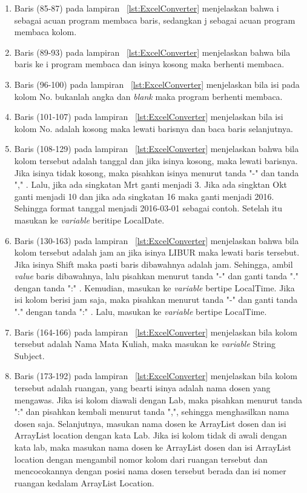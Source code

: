 \begin{enumerate}
\begin{enumerate}
		\item Baris (85-87) pada lampiran ~\ref{lst:ExcelConverter} menjelaskan bahwa i sebagai acuan program membaca baris, sedangkan j sebagai acuan program membaca kolom.
		\item Baris (89-93) pada lampiran ~\ref{lst:ExcelConverter} menjelaskan bahwa bila baris ke i program membaca dan isinya kosong maka berhenti membaca.
		\item Baris (96-100) pada lampiran ~\ref{lst:ExcelConverter} menjelaskan bila isi pada kolom No. bukanlah angka dan \textit{blank} maka program berhenti membaca.
		\item Baris (101-107) pada lampiran ~\ref{lst:ExcelConverter} menjelaskan	bila isi kolom No. adalah kosong maka lewati barisnya dan baca baris selanjutnya.
		\item Baris (108-129) pada lampiran ~\ref{lst:ExcelConverter} menjelaskan bahwa bila kolom tersebut adalah tanggal dan jika isinya kosong, maka lewati barisnya. Jika isinya tidak kosong, maka pisahkan isinya menurut tanda "-" dan tanda "," . Lalu, jika ada singkatan Mrt ganti menjadi 3. Jika ada singktan Okt ganti menjadi 10 dan jika ada singkatan 16 maka ganti menjadi 2016. Sehingga format tanggal menjadi 2016-03-01 sebagai contoh. Setelah itu masukan ke \textit{variable} beritipe LocalDate.
		\item Baris (130-163) pada lampiran ~\ref{lst:ExcelConverter} menjelaskan bahwa bila kolom tersebut adalah jam an jika isinya LIBUR maka lewati baris tersebut. Jika isinya Shift maka pasti baris dibawahnya adalah jam. Sehingga, ambil \textit{value} baris dibawahnya, lalu pisahkan menurut tanda "-" dan ganti tanda "." dengan tanda ":" . Kemudian, masukan ke \textit{variable} bertipe LocalTime. Jika isi kolom berisi jam saja, maka pisahkan menurut tanda "-" dan ganti tanda "." dengan tanda ":" . Lalu, masukan ke \textit{variable} bertipe LocalTime.
		\item Baris (164-166) pada lampiran ~\ref{lst:ExcelConverter} menjelaskan bila kolom tersebut adalah Nama Mata Kuliah, maka masukan ke \textit{variable} String Subject.
		\item Baris (173-192) pada lampiran ~\ref{lst:ExcelConverter} menjelaskan bila kolom tersebut adalah ruangan, yang bearti isinya adalah nama dosen yang mengawas. Jika isi kolom diawali dengan Lab, maka pisahkan menurut tanda ":" dan pisahkan kembali menurut tanda ",", sehingga menghasilkan nama dosen saja. Selanjutnya, masukan nama dosen ke ArrayList dosen dan isi ArrayList location dengan kata Lab. Jika isi kolom tidak di awali dengan kata lab, maka masukan nama dosen ke ArrayList dosen dan isi ArrayList location dengan mengambil nomor kolom dari ruangan tersebut dan mencocokannya dengan posisi nama dosen tersebut berada dan isi nomer ruangan kedalam ArrayList Location.

\end{enumerate}
\end{enumerate}
